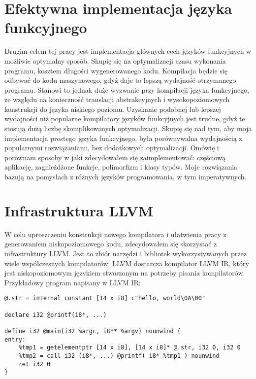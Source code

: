 \documentclass[declaration,shortabstract]{iithesis}
\begin{document}
\section{Efektywna implementacja języka funkcyjnego}

Drugim celem tej pracy jest implementacja głównych cech języków funkcyjnych w
możliwie optymalny sposób. Skupię się na optymalizacji czasu wykonania 
programu, kosztem długości wygenerowanego kodu. Kompilacja będzie się odbywać 
do kodu maszynowego, gdyż daje to lepszą wydajność otrzymanego programu. 
Stanowi to jednak duże wyzwanie przy kompilacji języka funkcyjnego, ze względu 
na konieczność translacji abstrakcyjnych i wysokopoziomowych konstrukcji do 
języka niskiego poziomu. Uzyskanie 
podobnej lub lepszej wydajności niż popularne kompilatory języków funkcyjnych
jest trudne,
gdyż te stosują dużą liczbę skomplikowanych optymalizacji. Skupię się nad tym, 
aby moja implementacja prostego języka funkcyjnego, była porównywalna 
wydajnością 
z popularnymi rozwiązaniami, bez dodatkowych optymalizacji. Omówię i porównam 
sposoby w jaki zdecydowałem się 
zaimplementować:
częściową aplikację, zagnieżdżone funkcje, polimorfizm i klasy typów. Moje 
rozwiązania bazują na pomysłach z różnych języków programowania, w tym 
imperatywnych. 

\section{Infrastruktura LLVM}




W celu uproszczeniu konstrukcji nowego kompilatora i ułatwienia pracy z generowaniem 
niskopoziomowego kodu, zdecydowałem się skorzystać z infrastruktury LLVM. Jest to zbiór 
narzędzi i bibliotek wykorzystywanych przez wiele współczesnych kompilatorów. LLVM dostarcza 
kompilator LLVM IR, który jest niskopoziomowym językiem stworzonym na potrzeby pisania 
kompilatorów. Przykładowy program napisany w LLVM IR:

\begin{lstlisting}[frame=single]
@.str = internal constant [14 x i8] c"hello, world\0A\00"

declare i32 @printf(i8*, ...)

define i32 @main(i32 %argc, i8** %argv) nounwind {
entry:
    %tmp1 = getelementptr [14 x i8], [14 x i8]* @.str, i32 0, i32 0
    %tmp2 = call i32 (i8*, ...) @printf( i8* %tmp1 ) nounwind
    ret i32 0
}
\end{lstlisting}
\end{document}
